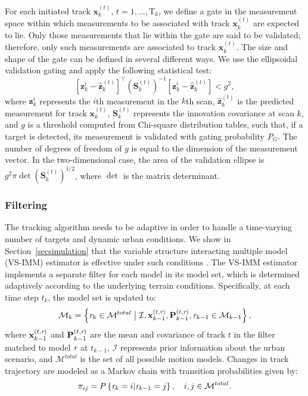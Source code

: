 \documentclass[times]{asjcauth}
\begin{document}
For each initiated track  $\mathbf{x}_{k}^{(t)}$, $t=1,\ldots,\mathrm{T}_{k}$, we define a gate in the measurement space within which measurements to be associated with track $\mathbf{x}_{k}^{(t)}$ are expected to lie. Only those measurements that lie within the gate are said to be validated; therefore, only such measurements are associated to track $\mathbf{x}_{k}^{(t)}$. The size and shape of the gate can be defined in several different ways. We use the ellipsoidal validation gating \cite{ellipsoid} and apply the following statistical test:
\begin{equation*}
\left[\mathbf{z}_{k}^{i}-\hat{\mathbf{z}}_{k}^{(t)}\right]^{\top}\left(\mathbf{S}_{k}^{(t)}\right)^{-1}\left[\mathbf{z}_{k}^{i}-\hat{\mathbf{z}}_{k}^{(t)}\right]<g^{2},
\end{equation*}
\noindent where $\mathbf{z}_{k}^{i}$ represents the $i$th measurement in the $k$th scan, $\hat{\mathbf{z}}_{k}^{(t)}$ is the predicted measurement for track $\mathbf{x}_{k}^{(t)}$, $\mathbf{S}_{k}^{(t)}$ represents the innovation covariance at scan $k$, and $g$ is a threshold computed from Chi-square distribution tables, such that, if a target is detected, its measurement is validated with gating probability $P_{G}$. The number of degrees of freedom of $g$ is equal to the dimension of the measurement vector. In the two-dimensional case, the area of the validation ellipse is $g^{2}\pi\det(\mathbf{S}_{k}^{(t)})^{1/2}$, where $\det$ is the matrix determinant.

\subsubsection{Filtering}
\label{secfiltering}

The tracking algorithm needs to be adaptive in order to handle a time-varying number of targets and dynamic urban conditions. We show in Section~\ref{secsimulation} that the variable structure interacting multiple model (VS-IMM) estimator is effective under such conditions \cite{VSIMM1,VSIMM2}. The VS-IMM estimator implements a separate filter for each model in its model set, which is determined adaptively according to the underlying terrain conditions. Specifically, at each time step $t_{k}$, the model set is updated to:
\begin{equation*}
\mathcal{M}_{k} =
\left\{\emph{r}_{k}\in\mathcal{M}^{total}\bigm|\mathcal{I},\mathbf{x}_{k-1}^{(t,\emph{r})},\mathbf{P}_{k-1}^{(t,\emph{r})},\emph{r}_{k-1}\in\mathcal{M}_{k-1}\right\},
\end{equation*}
\noindent where  $\mathbf{x}_{k-1}^{(t,\emph{r})}$ and $\mathbf{P}_{k-1}^{(t,\emph{r})}$ are the mean and covariance of track $t$ in the filter matched to model $\emph{r}$ at $t_{k-1}$, $\mathcal{I}$ represents prior information about the urban scenario, and $\mathcal{M}^{total}$ is the set of all possible motion models. Changes in track trajectory are modeled as a Markov chain with transition probabilities given by:
\begin{equation*}
\pi_{ij} = P\left\{\emph{r}_{k} = i|\emph{r}_{k-1}=j\right\},\quad
i,j\in\mathcal{M}^{total}.
\end{equation*}
\end{document}
